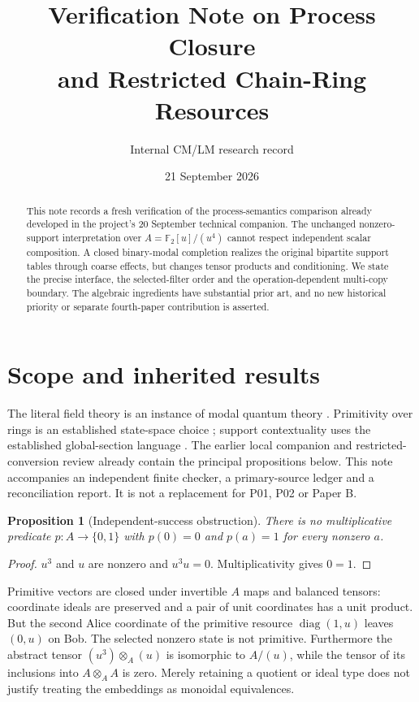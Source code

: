 \documentclass[11pt]{article}
\title{Verification Note on Process Closure\\and Restricted Chain-Ring Resources}
\author{Internal CM/LM research record}
\date{21 September 2026}
\newtheorem{proposition}[theorem]{Proposition}
\newcommand{\F}{\mathbb F_2}
\newcommand{\A}{\F[u]/(u^4)}
\DeclareMathOperator{\diag}{diag}
\begin{document}
\maketitle
\begin{abstract}
This note records a fresh verification of the process-semantics comparison already
developed in the project's 20 September technical companion. The unchanged
nonzero-support interpretation over $A=\A$ cannot respect independent scalar
composition. A closed binary-modal completion realizes the original bipartite
support tables through coarse effects, but changes tensor products and conditioning.
We state the precise interface, the selected-filter order and the operation-dependent
multi-copy boundary. The algebraic ingredients have substantial prior art, and no
new historical priority or separate fourth-paper contribution is asserted.
\end{abstract}

\section{Scope and inherited results}
The literal field theory is an instance of modal quantum theory
\cite{SW10,SW12}. Primitivity over rings is an established state-space choice
\cite{DB14}; support contextuality uses the established global-section language
\cite{AB11}. The earlier local companion and restricted-conversion review already
contain the principal propositions below. This note accompanies an independent
finite checker, a primary-source ledger and a reconciliation report. It is not a
replacement for P01, P02 or Paper B.

\begin{proposition}[Independent-success obstruction]
There is no multiplicative predicate $p:A\to\{0,1\}$ with $p(0)=0$ and
$p(a)=1$ for every nonzero $a$.
\end{proposition}
\begin{proof}
$u^3$ and $u$ are nonzero and $u^3u=0$. Multiplicativity gives $0=1$.
\end{proof}
Primitive vectors are closed under invertible $A$ maps and balanced tensors:
coordinate ideals are preserved and a pair of unit coordinates has a unit product.
But the second Alice coordinate of the primitive resource $\diag(1,u)$ leaves
$(0,u)$ on Bob. The selected nonzero state is not primitive. Furthermore the
abstract tensor $(u^3)\otimes_A(u)$ is isomorphic to $A/(u)$, while the tensor of
its inclusions into $A\otimes_A A$ is zero. Merely retaining a quotient or ideal
type does not justify treating the embeddings as monoidal equivalences.
\end{document}
